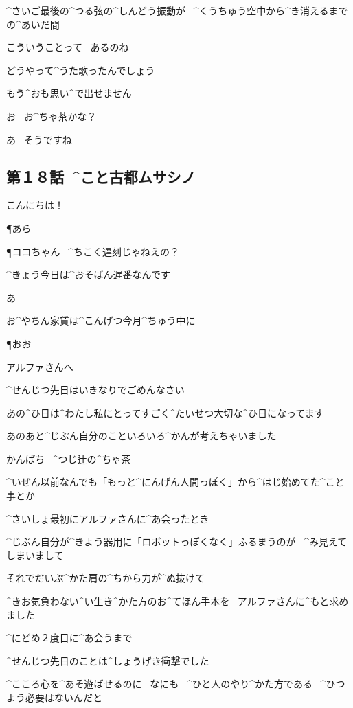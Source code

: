 \page
\K ^{さいご}{最後}の^{つる}{弦}の^{しんどう}{振動}が
\ ^{くうちゅう}{空中}から^{き}{消}えるまでの^{あいだ}{間}

\page[33]
\A こういうことって
\ あるのね

\K どうやって^{うた}{歌}ったんでしょう

\page
\K もう^{おも}{思}い^{で}{出}せません

\A お
\ お^{ちゃ}{茶}かな？

\K あ
\ そうですね


\subsection{第１８話\ ^{こと}{古都}ムサシノ}

\page[37]
\K こんにちは！

\P あら

\P ココちゃん
\ ^{ちこく}{遅刻}じゃねえの？

\K ^{きょう}{今日}は^{おそばん}{遅番}なんです

\K あ

\K お^{やちん}{家賃}は^{こんげつ}{今月}^{ちゅう}{中}に

\P おお

\page[39]
\K アルファさんへ

\K ^{せんじつ}{先日}はいきなりでごめんなさい

\page[41]
\K あの^{ひ}{日}は^{わたし}{私}にとってすごく^{たいせつ}{大切}な^{ひ}{日}になってます

\page
\K あのあと^{じぶん}{自分}のこといろいろ^{かんが}{考}えちゃいました

\Sign かんぱち
\ ^{つじ}{辻}の^{ちゃ}{茶}

\K ^{いぜん}{以前}なんでも「もっと^{にんげん}{人間}っぽく」から^{はじ}{始}めてた^{こと}{事}とか

\page
\K ^{さいしょ}{最初}にアルファさんに^{あ}{会}ったとき

\K ^{じぶん}{自分}が^{きよう}{器用}に「ロボットっぽくなく」ふるまうのが
\ ^{み}{見}えてしまいまして

\K それでだいぶ^{かた}{肩}の^{ちから}{力}が^{ぬ}{抜}けて

\K ^{きお}{気負}わない^{い}{生}き^{かた}{方}のお^{てほん}{手本}を
\ アルファさんに^{もと}{求}めました

\K ^{にどめ}{２度目}に^{あ}{会}うまで

\page
\K ^{せんじつ}{先日}のことは^{しょうげき}{衝撃}でした

\K ^{こころ}{心}を^{あそ}{遊}ばせるのに
\ なにも
\ ^{ひと}{人}のやり^{かた}{方}である
\ ^{ひつよう}{必要}はないんだと


